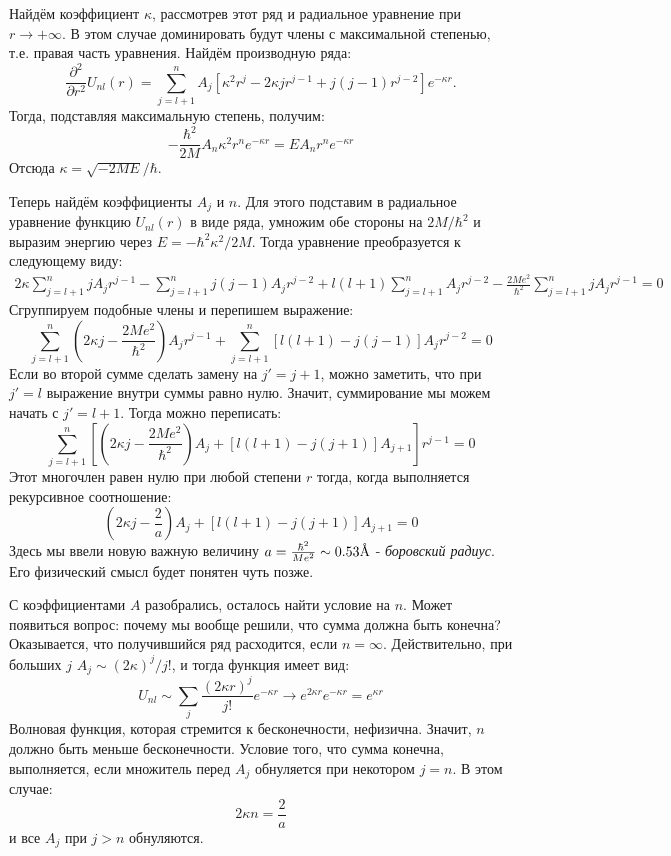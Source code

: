 Найдём коэффициент $\kappa$, рассмотрев этот ряд и радиальное уравнение при $r \rightarrow +\infty$. В этом случае доминировать будут члены с максимальной степенью, т.е. правая часть уравнения. Найдём производную ряда:
\[
\frac{\partial^2}{\partial r^2} U_{nl}(r) =  \sum\limits_{j=l+1}^{n} A_j[\kappa^2r^j - 2\kappa jr^{j-1} + j(j-1)r^{j-2}]e^{-\kappa r}.
\]
Тогда, подставляя максимальную степень, получим:
\[
 -\frac{\hbar^2}{2M}A_n\kappa^2r^n e^{-\kappa r} = E A_n r^n e^{-\kappa r}
\]
Отсюда $\kappa = \sqrt{-2ME}/\hbar$.

Теперь найдём коэффициенты $A_j$ и $n$. Для этого подставим в радиальное уравнение функцию $U_{nl}(r)$ в виде ряда, умножим обе стороны на $2M/\hbar^2$ и выразим энергию через $E = -\hbar^2\kappa^2/2M$. Тогда уравнение преобразуется к следующему виду:
\begin{align*}
    2\kappa\sum\limits_{j = l+1}^n jA_j r^{j-1} - \sum\limits_{j = l+1}^n j(j-1)A_j r^{j-2} + l(l+1)\sum\limits_{j = l+1}^n A_j r^{j-2} - \frac{2Me^2}{\hbar^2}\sum\limits_{j = l+1}^n jA_j r^{j-1} =0
\end{align*}
Сгруппируем подобные члены и перепишем выражение:
\[
\sum\limits_{j = l+1}^n\left(2\kappa j - \frac{2Me^2}{\hbar^2}\right)A_j r^{j-1} + \sum\limits_{j = l+1}^n [l(l+1) - j(j-1)] A_j r^{j-2} =0
\]
Если во второй сумме сделать замену на $j' = j + 1$, можно заметить, что при $j'=l$ выражение внутри суммы равно нулю. Значит, суммирование мы можем начать с $j'= l+ 1$. Тогда можно переписать:
\[
\sum\limits_{j = l+1}^n\left[\left(2\kappa j - \frac{2Me^2}{\hbar^2}\right)A_j+ [l(l+1) - j(j+1)] A_{j+1} \right]r^{j-1} = 0
\]
Этот многочлен равен нулю при любой степени $r$ тогда, когда выполняется рекурсивное соотношение:
\[
\left(2\kappa j - \frac{2}{a}\right)A_j+ [l(l+1) - j(j+1)] A_{j+1} = 0
\]
Здесь мы ввели новую важную величину $a = \frac{\hbar^2}{Me^2} \sim 0.53 \text{\r{A}}$ - \textit{боровский радиус}. Его физический смысл будет понятен чуть позже.

С коэффициентами $A$ разобрались, осталось найти условие на $n$. Может появиться вопрос: почему мы вообще решили, что сумма должна быть конечна? Оказывается, что получившийся ряд расходится, если $n=\infty$. Действительно, при больших $j$ $A_j \sim (2\kappa)^j/j!$, и тогда функция имеет вид:
\[
U_{nl} \sim \sum\limits_j\frac{(2\kappa r)^j}{j!}e^{-\kappa r} \rightarrow e^{2\kappa r}e^{-\kappa r} = e^{\kappa r}
\]
Волновая функция, которая стремится к бесконечности, нефизична. Значит, $n$ должно быть меньше бесконечности. Условие того, что сумма конечна, выполняется, если множитель перед $A_j$ обнуляется при некотором $j = n$. В этом случае:
\[
2\kappa n = \frac{2}{a}
\]
и все $A_j$ при $j > n$ обнуляются.

